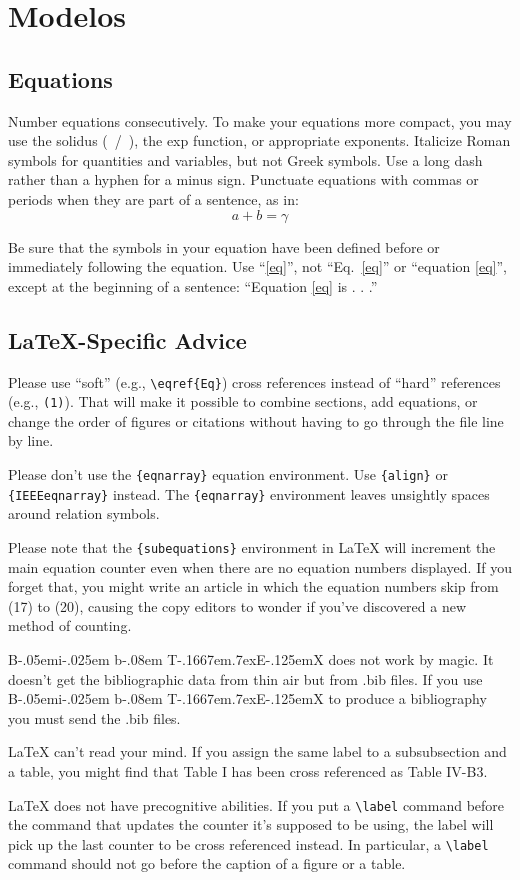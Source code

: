 \documentclass[conference]{IEEEtran}
\def\BibTeX{{\rm B\kern-.05em{\sc i\kern-.025em b}\kern-.08em
    T\kern-.1667em\lower.7ex\hbox{E}\kern-.125emX}}
\begin{document}









\section{Modelos}

\subsection{Equations}
Number equations consecutively. To make your
equations more compact, you may use the solidus (~/~), the exp function, or
appropriate exponents. Italicize Roman symbols for quantities and variables,
but not Greek symbols. Use a long dash rather than a hyphen for a minus
sign. Punctuate equations with commas or periods when they are part of a
sentence, as in:
\begin{equation}
    a+b=\gamma\label{eq}
\end{equation}

Be sure that the
symbols in your equation have been defined before or immediately following
the equation. Use ``\eqref{eq}'', not ``Eq.~\eqref{eq}'' or ``equation \eqref{eq}'', except at
the beginning of a sentence: ``Equation \eqref{eq} is . . .''

\subsection{\LaTeX-Specific Advice}

Please use ``soft'' (e.g., \verb|\eqref{Eq}|) cross references instead
of ``hard'' references (e.g., \verb|(1)|). That will make it possible
to combine sections, add equations, or change the order of figures or
citations without having to go through the file line by line.

Please don't use the \verb|{eqnarray}| equation environment. Use
\verb|{align}| or \verb|{IEEEeqnarray}| instead. The \verb|{eqnarray}|
environment leaves unsightly spaces around relation symbols.

Please note that the \verb|{subequations}| environment in {\LaTeX}
will increment the main equation counter even when there are no
equation numbers displayed. If you forget that, you might write an
article in which the equation numbers skip from (17) to (20), causing
the copy editors to wonder if you've discovered a new method of
counting.

    {\BibTeX} does not work by magic. It doesn't get the bibliographic
data from thin air but from .bib files. If you use {\BibTeX} to produce a
bibliography you must send the .bib files.

    {\LaTeX} can't read your mind. If you assign the same label to a
subsubsection and a table, you might find that Table I has been cross
referenced as Table IV-B3.

{\LaTeX} does not have precognitive abilities. If you put a
\verb|\label| command before the command that updates the counter it's
supposed to be using, the label will pick up the last counter to be
cross referenced instead. In particular, a \verb|\label| command
should not go before the caption of a figure or a table.
\end{document}
